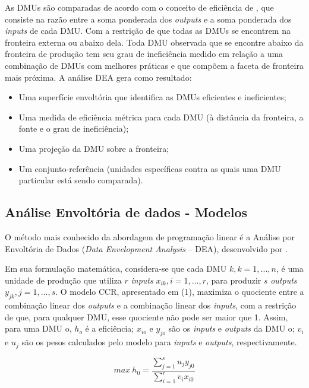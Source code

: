 As DMUs são comparadas de acordo com o conceito de eficiência de , que consiste na razão entre a soma ponderada dos \textit{outputs} e a soma ponderada dos \textit{inputs} de cada DMU. 
Com a restrição de que todas as DMUs se encontrem na fronteira externa ou abaixo dela. Toda DMU observada que se encontre abaixo da fronteira de produção tem seu grau de ineficiência medido em relação a uma combinação de DMUs com melhores práticas e que compõem a faceta de fronteira mais próxima. A análise DEA gera como resultado:

\begin{itemize}
	\item Uma superfície envoltória que identifica as DMUs eficientes e ineficientes;
	\item Uma medida de eficiência métrica para cada DMU (à distância da fronteira, a fonte e o grau de ineficiência);
	\item Uma projeção da DMU sobre a fronteira;
	\item Um conjunto-referência (unidades específicas contra as quais uma DMU particular está sendo comparada).
\end{itemize}

\subsection{Análise Envoltória de dados - Modelos}



O método mais conhecido da abordagem de programação linear é a Análise por Envoltória
de Dados (\textit{Data Envelopment Analysis} – DEA), desenvolvido por .


Em sua formulação matemática, considera-se que cada DMU $ k, k = 1, ..., n$, é uma unidade de produção que utiliza $r$ \textit{inputs} $x_{ik}, i =1, …, r$, para produzir $s$ \textit{outputs} $y_{jk}, j =1, …, s$. O modelo CCR, apresentado em (1), maximiza o quociente entre a combinação linear dos \textit{outputs} e a combinação linear dos \textit{inputs}, com a restrição de que, para qualquer DMU, esse quociente não pode ser maior que 1. Assim, para uma DMU o, $h_o$ é a eficiência; $x_{io}$ e $y_{jo}$ são os \textit{inputs} e \textit{outputs} da DMU o; $v_i$ e $u_j$ são os pesos calculados pelo modelo para \textit{inputs} e \textit{outputs}, respectivamente.

$$max\ h_0=\frac{\displaystyle\sum_{j=1}^{s} u_j y_{j0}}{\displaystyle\sum_{i=1}^{r} v_i x_{i0}} $$

